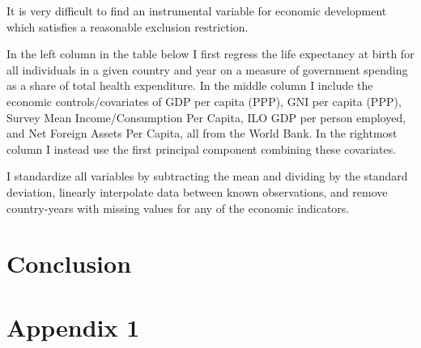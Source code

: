 \documentclass[12pt]{article}
\begin{document}
        It is very difficult to find an instrumental variable for economic development which satisfies a reasonable exclusion restriction.

        In the left column in the table below I first regress the life expectancy at birth for all individuals in a given country and year on a measure of government spending as a share of total health expenditure. In the middle column I include the economic controls/covariates of GDP per capita (PPP), GNI per capita (PPP), Survey Mean Income/Consumption Per Capita, ILO GDP per person employed, and Net Foreign Assets Per Capita, all from the World Bank. In the rightmost column I instead use the first principal component combining these covariates.

        I standardize all variables by subtracting the mean and dividing by the standard deviation, linearly interpolate data between known observations, and remove country-years with missing values for any of the economic indicators.

        





    \section*{Conclusion}

    \clearpage \newpage

    \appendix

    \section*{Appendix 1}

        
        
        
        
        
\end{document}
